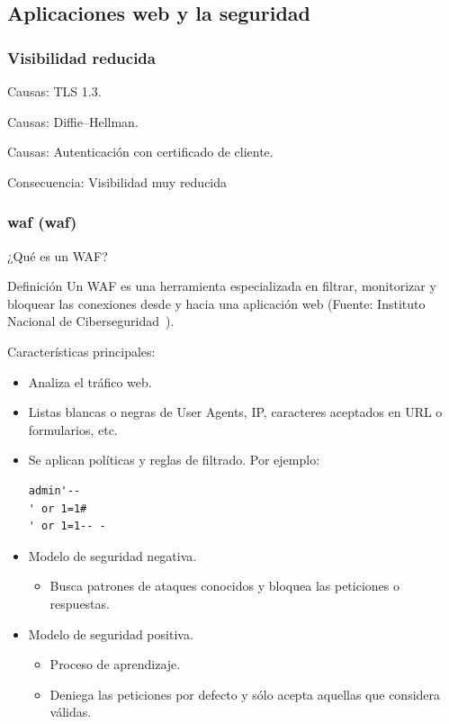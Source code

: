 \subsection{Aplicaciones web y la seguridad}
\begin{frame}[shrink=20]
  \frametitle{Visibilidad reducida}
  \par Causas: TLS 1.3.
  \par Causas: Diffie–Hellman.
  \par Causas: Autenticación con certificado de cliente.
  \par Consecuencia: Visibilidad muy reducida
\end{frame}

\begin{frame}[shrink=20,fragile]
  \frametitle{\acrlong{waf} (\acrshort{waf})}
  ¿Qué es un WAF?
  \begin{exampleblock}{Definición}
    Un WAF es una herramienta especializada en filtrar, monitorizar y bloquear las conexiones desde y hacia una aplicación web (Fuente: Instituto Nacional de Ciberseguridad~\cite{incibewaf}).
  \end{exampleblock}
  Características principales:
  \begin{itemize}
    \item Analiza el tráfico web.
    \item Listas blancas o negras de User Agents, IP, caracteres aceptados en URL o formularios, etc.
    \item Se aplican políticas y reglas de filtrado. Por ejemplo:
        \begin{lstlisting}
admin'--
' or 1=1#
' or 1=1-- -
        \end{lstlisting}
    \item Modelo de seguridad negativa.
      \begin{itemize}
        \item Busca patrones de ataques conocidos y bloquea las peticiones o respuestas.
      \end{itemize}
    \item Modelo de seguridad positiva.
      \begin{itemize}
        \item Proceso de aprendizaje.
        \item Deniega las peticiones por defecto y sólo acepta aquellas que considera válidas.
      \end{itemize}
  \end{itemize}
\end{frame}

